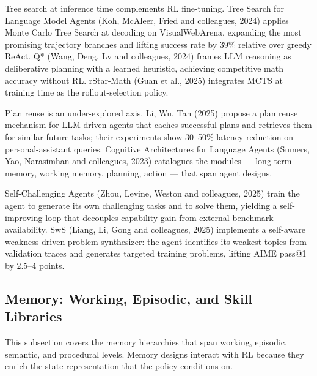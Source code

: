 Tree search at inference time complements RL fine-tuning. Tree Search for Language Model Agents (Koh, McAleer, Fried and colleagues, 2024) applies Monte Carlo Tree Search at decoding on VisualWebArena, expanding the most promising trajectory branches and lifting success rate by 39\% relative over greedy ReAct. Q* (Wang, Deng, Lv and colleagues, 2024) frames LLM reasoning as deliberative planning with a learned heuristic, achieving competitive math accuracy without RL. rStar-Math (Guan et al., 2025) integrates MCTS at training time as the rollout-selection policy.

Plan reuse is an under-explored axis. Li, Wu, Tan (2025) propose a plan reuse mechanism for LLM-driven agents that caches successful plans and retrieves them for similar future tasks; their experiments show 30--50\% latency reduction on personal-assistant queries. Cognitive Architectures for Language Agents (Sumers, Yao, Narasimhan and colleagues, 2023) catalogues the modules --- long-term memory, working memory, planning, action --- that span agent designs.

Self-Challenging Agents (Zhou, Levine, Weston and colleagues, 2025) train the agent to generate its own challenging tasks and to solve them, yielding a self-improving loop that decouples capability gain from external benchmark availability. SwS (Liang, Li, Gong and colleagues, 2025) implements a self-aware weakness-driven problem synthesizer: the agent identifies its weakest topics from validation traces and generates targeted training problems, lifting AIME pass@1 by 2.5--4 points.

\subsection{Memory: Working, Episodic, and Skill Libraries}\label{memory-working-episodic-and-skill-libraries}

This subsection covers the memory hierarchies that span working, episodic, semantic, and procedural levels. Memory designs interact with RL because they enrich the state representation that the policy conditions on.

